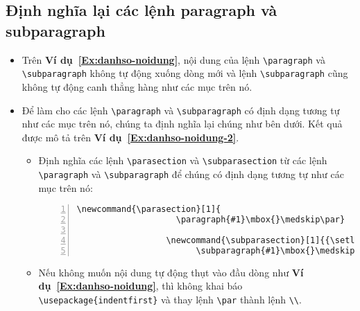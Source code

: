 \documentclass[12pt,a4paper]{article}
\newcommand{\parasection}[1]{\paragraph{#1}\mbox{}\medskip\par}
\newcommand{\subparasection}[1]{{\setlength{\parindent}{0pt}\subparagraph{#1}\mbox{}\medskip \par}}
\newcommand{\ex}[1]{\textbf{Ví dụ~#1}}
\begin{document}
\subsection{Định nghĩa lại các lệnh paragraph và subparagraph}
\begin{itemize}
  \item Trên \ex{\ref{Ex:danhso-noidung}}, nội dung của lệnh \Verb|\paragraph| và \Verb|\subparagraph| không tự động xuống dòng mới và lệnh \Verb|\subparagraph| cũng không tự động canh thẳng hàng như các mục trên nó.

  \item Để làm cho các lệnh \Verb|\paragraph| và \Verb|\subparagraph| có định dạng tương tự như các mục trên nó, chúng ta định nghĩa lại chúng như bên dưới. Kết quả được mô tả trên \ex{\ref{Ex:danhso-noidung-2}}.
        \begin{itemize}
          \item Định nghĩa các lệnh \Verb|\parasection| và \Verb|\subparasection| từ các lệnh \Verb|\paragraph| và \Verb|\subparagraph| để chúng có định dạng tương tự như các mục trên nó:
                \begin{Verbatim}[xleftmargin=10mm, numbers=left]
                  \newcommand{\parasection}[1]{
                    \paragraph{#1}\mbox{}\medskip\par}

                  \newcommand{\subparasection}[1]{{\setlength{\parindent}{0pt}
                        \subparagraph{#1}\mbox{}\medskip\par}}
                \end{Verbatim}

          \item Nếu không muốn nội dung tự động thụt vào đầu dòng như \ex{\ref{Ex:danhso-noidung}}, thì không khai báo \Verb|\usepackage{indentfirst}| và thay lệnh \Verb|\par| thành lệnh \Verb|\\|.


\end{itemize}
\end{itemize}
\end{document}
